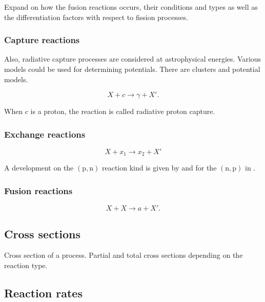 \documentclass[openany]{book}
\begin{document}
Expand  on how the fusion reactions occurs, their conditions and types as well as the differentiation factors with respect to fission processes.

\subsubsection{Capture reactions}

Also, radiative capture processes are considered at astrophysical energies. Various models could be used for determining potentials. There are clusters and potential models.

\begin{equation}
	X + c \rightarrow  \gamma + X'.
\end{equation}

When $c$ is a proton, the reaction is called radiative proton capture. \cite{brune_davids_2015}

\subsubsection{Exchange reactions}

\begin{equation}
	X +  x_1 \rightarrow x_2 + X'
\end{equation}

A development on the $\mathrm{(p,n)}$ reaction kind is given by \cite{whitehead_poxon-pearson_nunes_potel_2022} and for the $\mathrm{(n,p)}$ in \cite{sharma_gandhi_kumar_2022}. \\



\subsubsection{Fusion reactions}

\begin{equation}
	X + X \rightarrow a + X'.
\end{equation}

\subsection{Cross sections}

Cross section of a process. 
Partial and total cross sections depending on the reaction type.

\subsection{Reaction rates}
\end{document}
